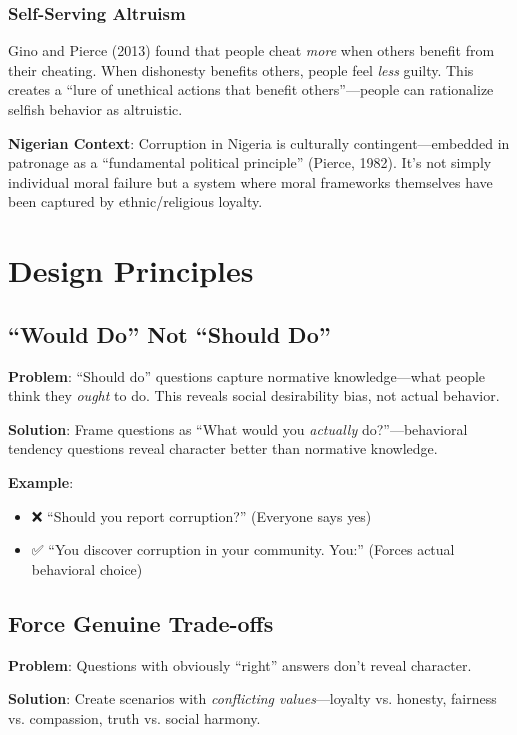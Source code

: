 \documentclass[11pt,a4paper]{article}
\begin{document}
\subsubsection{Self-Serving Altruism}

Gino and Pierce (2013) found that people cheat \textit{more} when others benefit from their cheating. When dishonesty benefits others, people feel \textit{less} guilty. This creates a ``lure of unethical actions that benefit others''—people can rationalize selfish behavior as altruistic.

\textbf{Nigerian Context}: Corruption in Nigeria is culturally contingent—embedded in patronage as a ``fundamental political principle'' (Pierce, 1982). It's not simply individual moral failure but a system where moral frameworks themselves have been captured by ethnic/religious loyalty.

\section{Design Principles}

\subsection{``Would Do'' Not ``Should Do''}

\textbf{Problem}: ``Should do'' questions capture normative knowledge—what people think they \textit{ought} to do. This reveals social desirability bias, not actual behavior.

\textbf{Solution}: Frame questions as ``What would you \textit{actually} do?''—behavioral tendency questions reveal character better than normative knowledge.

\textbf{Example}:
\begin{itemize}[leftmargin=*]
    \item ❌ ``Should you report corruption?'' (Everyone says yes)
    \item ✅ ``You discover corruption in your community. You:'' (Forces actual behavioral choice)
\end{itemize}

\subsection{Force Genuine Trade-offs}

\textbf{Problem}: Questions with obviously ``right'' answers don't reveal character.

\textbf{Solution}: Create scenarios with \textit{conflicting values}—loyalty vs. honesty, fairness vs. compassion, truth vs. social harmony.
\end{document}
